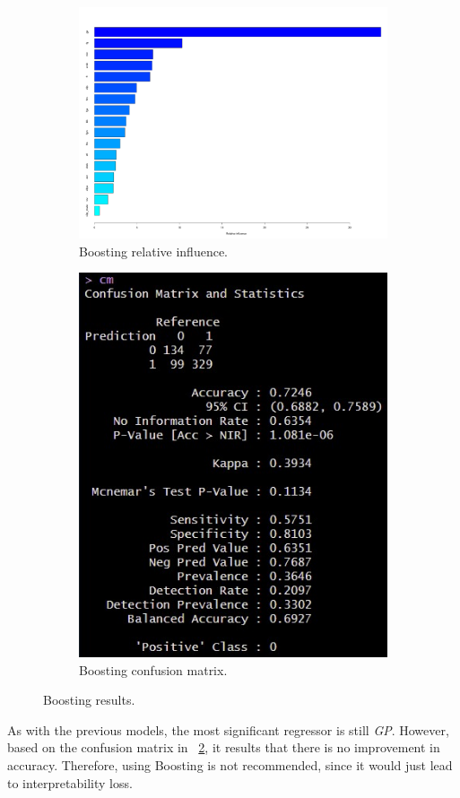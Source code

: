 \begin{figure}[H]
	\centering
	\begin{subfigure}{.5\textwidth}
		\centering
		\includegraphics[width=0.6\linewidth]{ImageFiles/Classification/Trees/boost_4_rel_inf}
		\caption{Boosting relative influence.}
		\label{fig:boost_4_rel_inf}
	\end{subfigure}%
	\hfill
	\begin{subfigure}{.5\textwidth}
		\centering
		\includegraphics[width=0.4\linewidth]{ImageFiles/Classification/Trees/boost_4_conf_mat}
		\caption{Boosting confusion matrix.}
		\label{fig:boost_4_conf_mat}
	\end{subfigure}
	\caption{Boosting results.}
	\label{BoostRes}
\end{figure}

As with the previous models, the most significant regressor is still \textit{GP}. However, based on the confusion matrix in \Fig~\ref{fig:boost_4_conf_mat}, it results that there is no improvement in accuracy. Therefore, using Boosting is not recommended, since it would just lead to interpretability loss.

